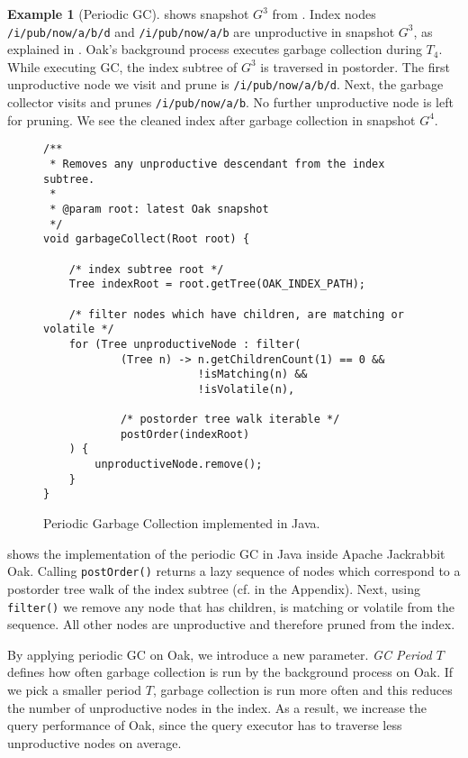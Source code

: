 \documentclass[abstracton,12pt]{scrartcl}
\theoremstyle{definition}
\newtheorem{example}{Example}
\begin{document}
\begin{example}[Periodic GC]
   shows snapshot $G^3$ from
  . Index nodes \texttt{/i/pub/now/a/b/d}
  and \texttt{/i/pub/now/a/b} are unproductive in snapshot $G^3$, as explained
  in . Oak's background process executes garbage
  collection during $T_4$. While executing GC, the index subtree of $G^3$ is
  traversed in postorder.
  The first unproductive node we visit and prune is
  \texttt{/i/pub/now/a/b/d}. Next, the garbage collector visits and prunes
  \texttt{/i/pub/now/a/b}. No further unproductive node is left for pruning. We
  see the cleaned index after garbage collection in snapshot $G^4$.
\end{example}

\begin{figure}[H]
  \small
  \begin{framed}
\begin{verbatim}
/**
 * Removes any unproductive descendant from the index subtree.
 *
 * @param root: latest Oak snapshot 
 */
void garbageCollect(Root root) {

    /* index subtree root */
    Tree indexRoot = root.getTree(OAK_INDEX_PATH);

    /* filter nodes which have children, are matching or volatile */
    for (Tree unproductiveNode : filter(
            (Tree n) -> n.getChildrenCount(1) == 0 &&
                        !isMatching(n) &&
                        !isVolatile(n),

            /* postorder tree walk iterable */
            postOrder(indexRoot)
    ) {
        unproductiveNode.remove();
    }
}
\end{verbatim}
  \end{framed}
  \caption[Periodic GC implemented in Java]{Periodic Garbage Collection
    implemented in Java.}
  \label{fig:java_periodic_gc}
\end{figure}

 shows the implementation of the periodic
GC in Java inside Apache Jackrabbit Oak. Calling \texttt{postOrder()} returns a
lazy sequence of nodes
which correspond to a postorder tree walk of the index subtree (cf.
 in the Appendix). Next, using \texttt{filter()} we
remove any node
that has children, is matching or volatile from the sequence. All other nodes are
unproductive and therefore pruned from the index.

By applying periodic GC on Oak, we introduce a new
parameter. \textit{GC Period $T$} defines how often garbage collection is run by
the background process on Oak. If we pick a smaller
period $T$, garbage collection is run more often and this
reduces the number of unproductive nodes in the index. As a result, we
increase the query performance of Oak,
since the query executor has to traverse less unproductive nodes on average.
\end{document}

